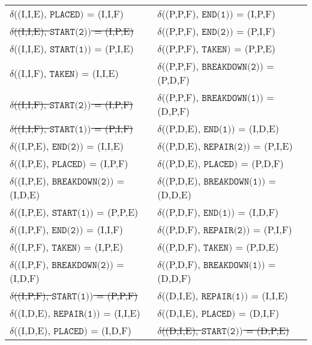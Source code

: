 \begin{table}[H]\centering
  \begin{tabular}{ll}
    $\delta$((I,I,E), $\texttt{PLACED})$ = (I,I,F)       & $\delta$((P,P,F), $\texttt{END(1)})$ = (I,P,F)       \\
    \sout{$\delta$((I,I,E), $\texttt{START(2)})$ = (I,P,E)}     & $\delta$((P,P,F), $\texttt{END(2)})$ = (P,I,F)       \\
    $\delta$((I,I,E), $\texttt{START(1)})$ = (P,I,E)     & $\delta$((P,P,F), $\texttt{TAKEN})$ = (P,P,E)        \\
    $\delta$((I,I,F), $\texttt{TAKEN})$ = (I,I,E)        & $\delta$((P,P,F), $\texttt{BREAKDOWN(2)})$ = (P,D,F) \\
    \sout{$\delta$((I,I,F), $\texttt{START(2)})$ = (I,P,F)}     & $\delta$((P,P,F), $\texttt{BREAKDOWN(1)})$ = (D,P,F) \\
    \sout{$\delta$((I,I,F), $\texttt{START(1)})$ = (P,I,F)}     & $\delta$((P,D,E), $\texttt{END(1)})$ = (I,D,E)       \\
    $\delta$((I,P,E), $\texttt{END(2)})$ = (I,I,E)       & $\delta$((P,D,E), $\texttt{REPAIR(2)})$ = (P,I,E)    \\
    $\delta$((I,P,E), $\texttt{PLACED})$ = (I,P,F)       & $\delta$((P,D,E), $\texttt{PLACED})$ = (P,D,F)       \\
    $\delta$((I,P,E), $\texttt{BREAKDOWN(2)})$ = (I,D,E) & $\delta$((P,D,E), $\texttt{BREAKDOWN(1)})$ = (D,D,E) \\
    $\delta$((I,P,E), $\texttt{START(1)})$ = (P,P,E)     & $\delta$((P,D,F), $\texttt{END(1)})$ = (I,D,F)       \\
    $\delta$((I,P,F), $\texttt{END(2)})$ = (I,I,F)       & $\delta$((P,D,F), $\texttt{REPAIR(2)})$ = (P,I,F)    \\
    $\delta$((I,P,F), $\texttt{TAKEN})$ = (I,P,E)        & $\delta$((P,D,F), $\texttt{TAKEN})$ = (P,D,E)         \\
    $\delta$((I,P,F), $\texttt{BREAKDOWN(2)})$ = (I,D,F) & $\delta$((P,D,F), $\texttt{BREAKDOWN(1)})$ = (D,D,F)  \\
    \sout{$\delta$((I,P,F), $\texttt{START(1)})$ = (P,P,F)}    & $\delta$((D,I,E), $\texttt{REPAIR(1)})$ = (I,I,E)     \\
    $\delta$((I,D,E), $\texttt{REPAIR(1)})$ = (I,I,E)    & $\delta$((D,I,E), $\texttt{PLACED})$ = (D,I,F)        \\
    $\delta$((I,D,E), $\texttt{PLACED})$ = (I,D,F)       & \sout{$\delta$((D,I,E), $\texttt{START(2)})$ = (D,P,E)}      \\

\end{tabular}
\end{table}
